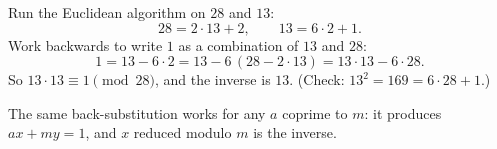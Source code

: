 Run the Euclidean algorithm on $28$ and $13$:
\[28=2\cdot13+2,\qquad13=6\cdot2+1.\]
Work backwards to write $1$ as a combination of $13$ and $28$:
\[1=13-6\cdot2=13-6\,(28-2\cdot13)=13\cdot13-6\cdot28.\]
So $13\cdot13\equiv1\pmod{28}$, and the inverse is $\boxed{13}$. (Check: $13^2=169=6\cdot28+1$.)

The same back-substitution works for any $a$ coprime to $m$: it produces $ax+my=1$, and $x$ reduced modulo $m$ is the inverse.
